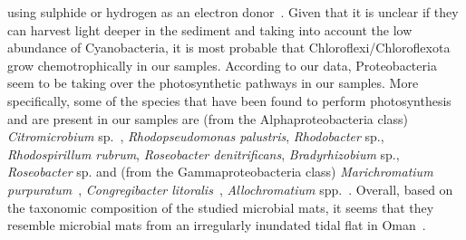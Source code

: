    using sulphide or hydrogen as an electron donor~\citep{tang_complete_2011, kawai_hydrogen-dependent_2019, kawai_-situ_2021}. 
   Given that it is unclear if they can harvest light deeper in the sediment and taking into account 
   the low abundance of Cyanobacteria, it is most probable that Chloroflexi/Chloroflexota grow chemotrophically in our samples. 
   According to our data, Proteobacteria seem to be taking over the photosynthetic pathways in our samples. 
   More specifically, some of the species that have been found to perform photosynthesis and are present in our samples are
   (from the Alphaproteobacteria class) \textit{Citromicrobium} sp.~\citep{jiao_coexistence_2010}, 
   \textit{Rhodopseudomonas palustris}, \textit{Rhodobacter} sp., \textit{Rhodospirillum rubrum}, 
   \textit{Roseobacter denitrificans}, \textit{Bradyrhizobium} sp., \textit{Roseobacter} sp. 
   \citep{larimer_complete_2004, bryant_prokaryotic_2006}
   and (from the Gammaproteobacteria class) 
   \textit{Marichromatium purpuratum}~\citep{shiung_photosynthetic_2018}, 
   \textit{Congregibacter litoralis}~\citep{fuchs_characterization_2007, spring_photosynthetic_2009}, 
   \textit{Allochromatium} spp.~\citep{kyndt_genome_2020}. 
   Overall, based on the taxonomic composition of the studied microbial mats, 
   it seems that they resemble microbial mats from an irregularly inundated tidal flat in Oman~\citep{meier_limitation_2021}.


